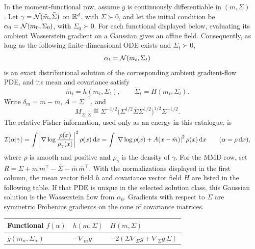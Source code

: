 \begin{prop}\label{prop-centered-gaussian-covariance-catalogue}
	In the moment-functional row, assume $g$ is continuously differentiable in $(m,\Sigma)$. Let \(\gamma=\mathcal{N}(\bar m,\bar\Sigma)\) on \(\mathbb{R}^d\), with \(\bar\Sigma\succ0\), and let the initial condition be \(\alpha_0=\mathcal{N}(m_0,\Sigma_0)\), with \(\Sigma_0\succ0\). For each functional displayed below, evaluating its ambient Wasserstein gradient on a Gaussian gives an affine field. Consequently, as long as the following finite-dimensional ODE exists and \(\Sigma_t\succ0\),
	\[
		\alpha_t=\mathcal{N}(m_t,\Sigma_t)
	\]
	is an exact distributional solution of the corresponding ambient gradient-flow PDE, and its mean and covariance satisfy
	\[
		\dot{m}_t=h(m_t,\Sigma_t),
		\qquad
		\dot{\Sigma}_t=H(m_t,\Sigma_t).
	\]
	Write \(\delta_m=m-\bar m\), \(A=\bar\Sigma^{-1}\), and
	\[
		M_{\Sigma,\bar\Sigma}
		\eqdef
		\Sigma^{-1/2}\bigl(\Sigma^{1/2}\bar\Sigma\Sigma^{1/2}\bigr)^{1/2}\Sigma^{-1/2}.
	\]
	The relative Fisher information, used only as an energy in this catalogue, is
	\[
		\mathcal I(\alpha|\gamma)
		=
		\int \left|\nabla\log\frac{\rho(x)}{\rho_\gamma(x)}\right|^2\rho(x)\,\mathrm{d} x
		=
		\int
		\left|\nabla\log\rho(x)+A(x-\bar m)\right|^2\rho(x)\,\mathrm{d} x
		\qquad(\alpha=\rho\,\mathrm{d} x),
	\]
	where $\rho$ is smooth and positive and $\rho_\gamma$ is the density of $\gamma$. For the MMD row, set $R=\Sigma+m\,m^\top-\bar\Sigma-\bar m\,\bar m^\top$.
	With the normalizations displayed in the first column, the mean vector field \(h\) and covariance vector field \(H\) are listed in the following table. If that PDE is unique in the selected solution class, this Gaussian solution is the Wasserstein flow from \(\alpha_0\). Gradients with respect to \(\Sigma\) are symmetric Frobenius gradients on the cone of covariance matrices.
		\begin{center}
		\begingroup
		\small
		\renewcommand{\arraystretch}{1.55}
		\begin{tabularx}{\linewidth}{>{\raggedright\arraybackslash}p{.42\linewidth}>{\centering\arraybackslash}p{.18\linewidth}>{\raggedright\arraybackslash}X}
			\hline
			Functional \(f(\alpha)\) & \(h(m,\Sigma)\) & \(H(m,\Sigma)\) \\
			\hline
			\(g(m_\alpha,\Sigma_\alpha)\)
			&
			\(-\nabla_m g\)
			&
			\(-2(\Sigma\nabla_\Sigma g+\nabla_\Sigma g\,\Sigma)\)
			\\

\end{tabularx}
\end{center}
\end{prop}
